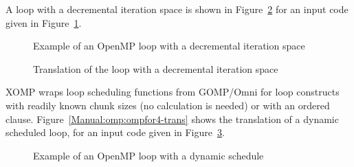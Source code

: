 A loop with a decremental iteration space is shown in 
Figure~\ref{Manual:omp:ompfor5-trans} for an input code given in
Figure~\ref{Manual:omp:ompfor5}. 

\lstset{language=C,basicstyle=\scriptsize}
\begin{figure}[htbp]
{\indent
  {\mySmallFontSize
    \begin{latexonly}
    
    \end{latexonly}
    \begin{htmlonly}
    
    \end{htmlonly}
  }
}
\caption{Example of an OpenMP loop with a decremental iteration space}
\label{Manual:omp:ompfor5}
\end{figure}

\begin{figure}[htbp]
{\indent
  {\mySmallFontSize
    \begin{latexonly}
    
    \end{latexonly}
    \begin{htmlonly}
    
    \end{htmlonly}
  }
}
\caption{Translation of the loop with a decremental iteration space}
\label{Manual:omp:ompfor5-trans}
\end{figure}

XOMP wraps loop scheduling functions from GOMP/Omni for loop constructs with readily
known chunk sizes (no calculation is needed) or with an ordered clause. 
Figure~\ref{Manual:omp:ompfor4-trans} shows the translation of a dynamic scheduled loop,  for an input code given in
Figure~\ref{Manual:omp:ompfor4}. 

\lstset{language=C,basicstyle=\scriptsize}
\begin{figure}[htbp]
{\indent
  {\mySmallFontSize
    \begin{latexonly}
    
    \end{latexonly}
    \begin{htmlonly}
    
    \end{htmlonly}
  }
}
\caption{Example of an OpenMP loop with a dynamic schedule}
\label{Manual:omp:ompfor4}
\end{figure}

